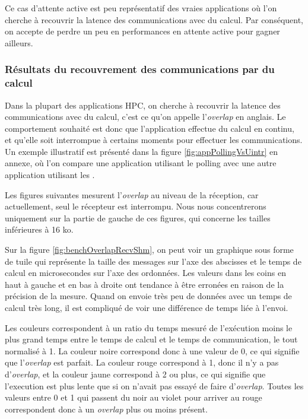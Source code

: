 Ce cas d'attente active est peu représentatif des vraies applications où l'on cherche à recouvrir la latence des communications avec du calcul.
Par conséquent, on accepte de perdre un peu en performances en attente active pour gagner ailleurs.

\subsubsection{Résultats du recouvrement des communications par du calcul}

Dans la plupart des applications HPC, on cherche à recouvrir la latence des communications avec du calcul, c'est ce qu'on appelle l'\emph{overlap} en anglais.
Le comportement souhaité est donc que l'application effectue du calcul en continu, et qu'elle soit interrompue à certains moments pour effectuer les communications.
Un exemple illustratif est présenté dans la figure \ref{fig:appPollingVsUintr} en annexe, où l'on compare une application utilisant le polling avec une autre application utilisant les \uintr{}.

Les figures suivantes mesurent l'\emph{overlap} au niveau de la réception, car actuellement, seul le récepteur est interrompu.
Nous nous concentrerons uniquement sur la partie de gauche de ces figures, qui concerne les tailles inférieures à 16 ko.

Sur la figure \ref{fig:benchOverlapRecvShm}, on peut voir un graphique sous forme de tuile qui représente la taille des messages sur l'axe des abscisses
et le temps de calcul en microsecondes sur l'axe des ordonnées.
Les valeurs dans les coins en haut à gauche et en bas à droite ont tendance à être erronées en raison de la précision de la mesure.
Quand on envoie très peu de données avec un temps de calcul très long, il est compliqué de voir une différence de temps liée à l'envoi.

Les couleurs correspondent à un ratio du temps mesuré de l'exécution moins le plus grand temps entre le temps de calcul et le temps de communication, le tout normalisé à 1.
La couleur noire correspond donc à une valeur de 0, ce qui signifie que l'\emph{overlap} est parfait.
La couleur rouge correspond à 1, donc il n'y a pas d'\emph{overlap},
et la couleur jaune correspond à 2 ou plus, ce qui signifie que l'execution est plus lente que si on n'avait pas essayé de faire d'\emph{overlap}.
Toutes les valeurs entre 0 et 1 qui passent du noir au violet pour arriver au rouge correspondent donc à un \emph{overlap} plus ou moins présent.

